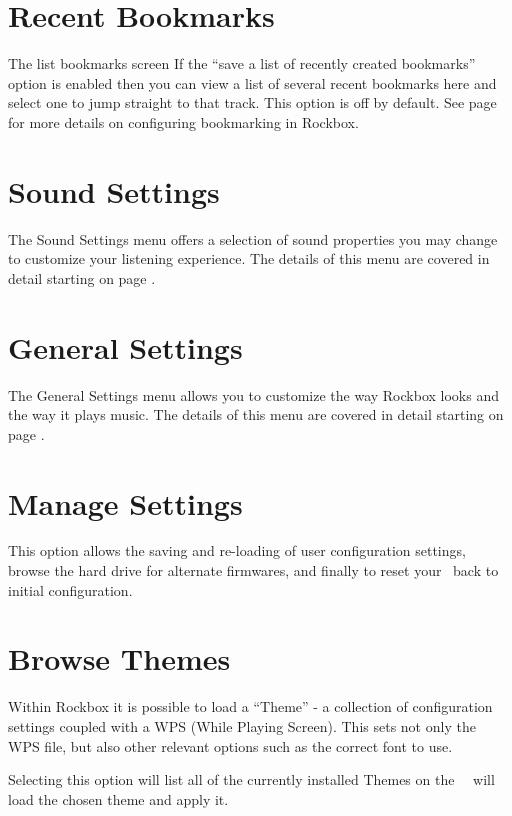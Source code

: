 \section {Recent Bookmarks}
%
  {The list bookmarks screen}{}
If the ``save a list of recently created bookmarks'' option is enabled 
then you can view a list of several recent bookmarks here and select one to 
jump straight to that track.  This option is off by default. See page 
\pageref{ref:Bookmarkconfigactual} for more details on configuring bookmarking
in Rockbox.

\section{Sound Settings}
The Sound Settings menu offers a selection of sound properties you may 
change to customize your listening experience.  The details of this menu are 
covered in detail starting on page \pageref{ref:configure_rockbox_sound}. 

\section{General Settings}
The General Settings menu allows you to customize the way Rockbox looks and 
the way it plays music.  The details of this menu are covered in detail 
starting on page \pageref{ref:configure_rockbox_general}.

\section{Manage Settings}
This option allows the saving and re-loading of user configuration settings, 
browse the hard drive for alternate firmwares, and finally to reset your 
\dap\ back to initial configuration.

\section{Browse Themes}
Within Rockbox it is possible to load a ``Theme'' - a collection of configuration 
settings coupled with a WPS (While Playing Screen).  This sets not only the WPS 
file, but also other relevant options such as the correct font to use.

Selecting this option will list all of the currently installed Themes on the 
\dap\, \ButtonRight\ will load the chosen theme and apply it.
      
